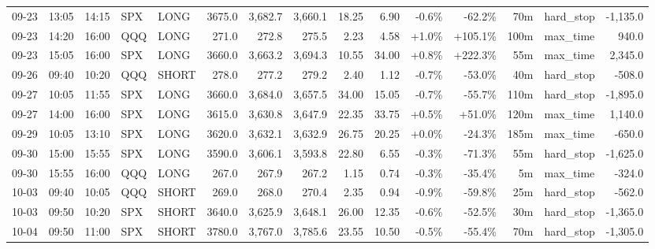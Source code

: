 \documentclass[11pt,a4paper,twoside]{article}
\begin{document}
\begin{landscape}
\begin{center}
\begin{longtable}{>{\color{txtmain}}l l l l l r r r r r r r r >{\color{txtmain}}l r}
09-23 & 13:05 & 14:15 & SPX & LONG & 3675.0 & 3,682.7 & 3,660.1 & 18.25 & 6.90 & \textcolor{lossred}{-0.6\%} & \textcolor{lossred}{-62.2\%} & 70m & hard\_stop & \textcolor{lossred}{-1,135.0} \\
09-23 & 14:20 & 16:00 & QQQ & LONG & 271.0 & 272.8 & 275.5 & 2.23 & 4.58 & \textcolor{wingreen}{+1.0\%} & \textcolor{wingreen}{+105.1\%} & 100m & max\_time & \textcolor{wingreen}{940.0} \\
09-23 & 15:05 & 16:00 & SPX & LONG & 3660.0 & 3,663.2 & 3,694.3 & 10.55 & 34.00 & \textcolor{wingreen}{+0.8\%} & \textcolor{wingreen}{+222.3\%} & 55m & max\_time & \textcolor{wingreen}{2,345.0} \\
09-26 & 09:40 & 10:20 & QQQ & SHORT & 278.0 & 277.2 & 279.2 & 2.40 & 1.12 & \textcolor{lossred}{-0.7\%} & \textcolor{lossred}{-53.0\%} & 40m & hard\_stop & \textcolor{lossred}{-508.0} \\
09-27 & 10:05 & 11:55 & SPX & LONG & 3660.0 & 3,684.0 & 3,657.5 & 34.00 & 15.05 & \textcolor{lossred}{-0.7\%} & \textcolor{lossred}{-55.7\%} & 110m & hard\_stop & \textcolor{lossred}{-1,895.0} \\
09-27 & 14:00 & 16:00 & SPX & LONG & 3615.0 & 3,630.8 & 3,647.9 & 22.35 & 33.75 & \textcolor{wingreen}{+0.5\%} & \textcolor{wingreen}{+51.0\%} & 120m & max\_time & \textcolor{wingreen}{1,140.0} \\
09-29 & 10:05 & 13:10 & SPX & LONG & 3620.0 & 3,632.1 & 3,632.9 & 26.75 & 20.25 & \textcolor{wingreen}{+0.0\%} & \textcolor{lossred}{-24.3\%} & 185m & max\_time & \textcolor{lossred}{-650.0} \\
09-30 & 15:00 & 15:55 & SPX & LONG & 3590.0 & 3,606.1 & 3,593.8 & 22.80 & 6.55 & \textcolor{lossred}{-0.3\%} & \textcolor{lossred}{-71.3\%} & 55m & hard\_stop & \textcolor{lossred}{-1,625.0} \\
09-30 & 15:55 & 16:00 & QQQ & LONG & 267.0 & 267.9 & 267.2 & 1.15 & 0.74 & \textcolor{lossred}{-0.3\%} & \textcolor{lossred}{-35.4\%} & 5m & max\_time & \textcolor{lossred}{-324.0} \\
10-03 & 09:40 & 10:05 & QQQ & SHORT & 269.0 & 268.0 & 270.4 & 2.35 & 0.94 & \textcolor{lossred}{-0.9\%} & \textcolor{lossred}{-59.8\%} & 25m & hard\_stop & \textcolor{lossred}{-562.0} \\
10-03 & 09:50 & 10:20 & SPX & SHORT & 3640.0 & 3,625.9 & 3,648.1 & 26.00 & 12.35 & \textcolor{lossred}{-0.6\%} & \textcolor{lossred}{-52.5\%} & 30m & hard\_stop & \textcolor{lossred}{-1,365.0} \\
10-04 & 09:50 & 11:00 & SPX & SHORT & 3780.0 & 3,767.0 & 3,785.6 & 23.55 & 10.50 & \textcolor{lossred}{-0.5\%} & \textcolor{lossred}{-55.4\%} & 70m & hard\_stop & \textcolor{lossred}{-1,305.0} \\

\end{longtable}
\end{center}
\end{landscape}
\end{document}
